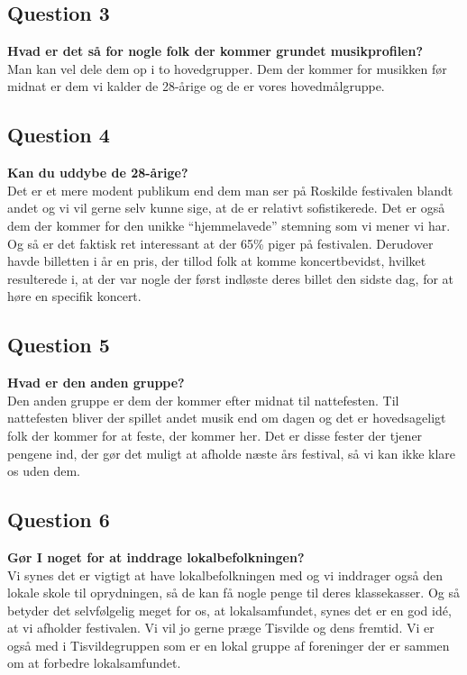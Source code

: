 \subsection{Question 3}
\label{i2q3}
\noindent \textbf{Hvad er det så for nogle folk der kommer grundet musikprofilen?} \\
Man kan vel dele dem op i to hovedgrupper. Dem der kommer for musikken før midnat er dem vi kalder de 28-årige og de er vores hovedmålgruppe. 

\subsection{Question 4}
\label{i2q4}
\noindent \textbf{Kan du uddybe de 28-årige?} \\
Det er et mere modent publikum end dem man ser på Roskilde festivalen blandt andet og vi vil gerne selv kunne sige, at de er relativt sofistikerede. Det er også dem der kommer for den unikke “hjemmelavede” stemning som vi mener vi har. Og så er det faktisk ret interessant at der 65\% piger på festivalen. Derudover havde billetten i år en pris, der tillod folk at komme koncertbevidst, hvilket resulterede i, at der var nogle der først indløste deres billet den sidste dag, for at høre en specifik koncert.

\subsection{Question 5}
\label{i2q5}
\noindent \textbf{Hvad er den anden gruppe?} \\
Den anden gruppe er dem der kommer efter midnat til nattefesten. Til nattefesten bliver der spillet andet musik end om dagen og det er hovedsageligt folk der kommer for at feste, der kommer her. Det er disse fester der tjener pengene ind, der gør det muligt at afholde næste års festival, så vi kan ikke klare os uden dem. 

\subsection{Question 6}
\label{i2q6}
\noindent \textbf{Gør I noget for at inddrage lokalbefolkningen?} \\
Vi synes det er vigtigt at have lokalbefolkningen med og vi inddrager også den lokale skole til oprydningen, så de kan få nogle penge til deres klassekasser. Og så betyder det selvfølgelig meget for os, at lokalsamfundet, synes det er en god idé, at vi afholder festivalen. Vi vil jo gerne præge Tisvilde og dens fremtid. Vi er også med i Tisvildegruppen som er en lokal gruppe af foreninger der er sammen om at forbedre lokalsamfundet.

